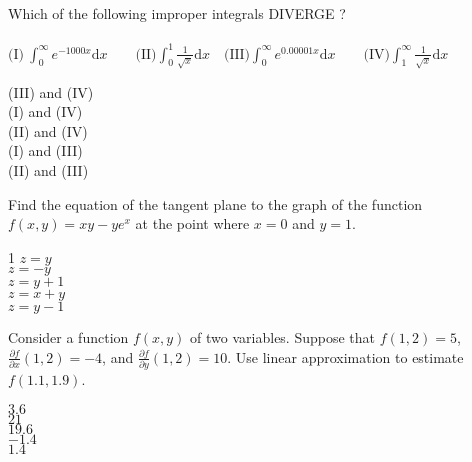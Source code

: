 \documentclass[12pt]{amsart}
\def\medno{\medskip \noindent}
\def\D{\mathrm{d}}
\begin{document}
\begin{exam}
\begin{problem}
%
\end{problem}




\begin{problem}
Which of the following improper integrals DIVERGE \@?
\\
\\
\medno 
$\mbox{(I)}\ \int_0^\infty e^{-1000 x}\D x \qquad \mbox{(II)}  
\int_0^1 \frac{1}{\sqrt{x}}\D  x \quad \mbox{(III)}  
\int_0^{\infty} e^{0.00001 x}\D  x 
\qquad \mbox{(IV)}  
\int_1^\infty \frac{1}{\sqrt{x}}\D  x \quad \qquad $
%
\begin{answers}{1}
(III) and (IV) \\
(I) and (IV) \\
(II) and (IV) \\
(I) and (III) \\
(II) and (III)\\
\end{answers}
\end{problem}





\begin{problem}
Find the equation of the tangent plane to the graph of
the function $f(x, y) = xy - ye^x$  at the point 
where $x=0$ and $y=1$.  
%
\begin{answers}1
$z=y$\\
$z=-y$ \\
$z=y+1$\\
$z=x+y$\\
$z=y-1$\\
\end{answers}
\end{problem}








\begin{problem}
Consider a function $f(x,y)$ of two variables.  Suppose that
$f(1,2) = 5$, 
$\frac{\partial f}{\partial x}(1,2) = -4$, and
$\frac{\partial f}{\partial y}(1,2) = 10$.  Use linear approximation
to estimate $f(1.1, 1.9)$.
\begin{answers}{1}
$3.6$ \\
$21$ \\
$19.6$  \\
$-1.4$ \\
$1.4$  \\
\end{answers}
\end{problem}


\end{exam}
\end{document}
